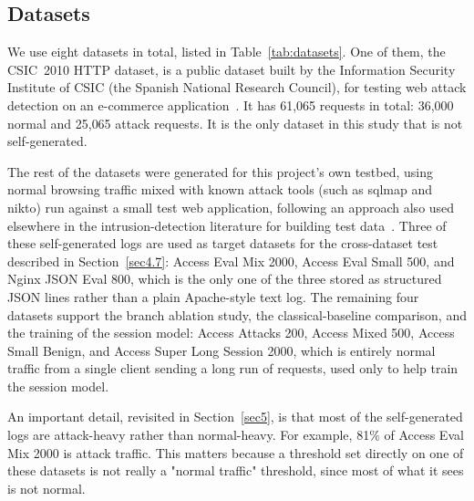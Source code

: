 \documentclass[futureinternet,article,submit,moreauthors]{Definitions/mdpi}
\begin{document}
\subsection{Datasets} \label{sec4.2}

We use eight datasets in total, listed in Table~\ref{tab:datasets}. One of them, the CSIC~2010 HTTP dataset, is a public dataset built by the Information Security Institute of CSIC (the Spanish National Research Council), for testing web attack detection on an e-commerce application~\cite{csic2010}. It has 61{,}065 requests in total: 36{,}000 normal and 25{,}065 attack requests. It is the only dataset in this study that is not self-generated.

The rest of the datasets were generated for this project's own testbed, using normal browsing traffic mixed with known attack tools (such as sqlmap and nikto) run against a small test web application, following an approach also used elsewhere in the intrusion-detection literature for building test data~\cite{shiravi2012}. Three of these self-generated logs are used as target datasets for the cross-dataset test described in Section~\ref{sec4.7}: Access Eval Mix 2000, Access Eval Small 500, and Nginx JSON Eval 800, which is the only one of the three stored as structured JSON lines rather than a plain Apache-style text log. The remaining four datasets support the branch ablation study, the classical-baseline comparison, and the training of the session model: Access Attacks 200, Access Mixed 500, Access Small Benign, and Access Super Long Session 2000, which is entirely normal traffic from a single client sending a long run of requests, used only to help train the session model.

An important detail, revisited in Section~\ref{sec5}, is that most of the self-generated logs are attack-heavy rather than normal-heavy. For example, 81\% of Access Eval Mix 2000 is attack traffic. This matters because a threshold set directly on one of these datasets is not really a "normal traffic" threshold, since most of what it sees is not normal.
\end{document}
